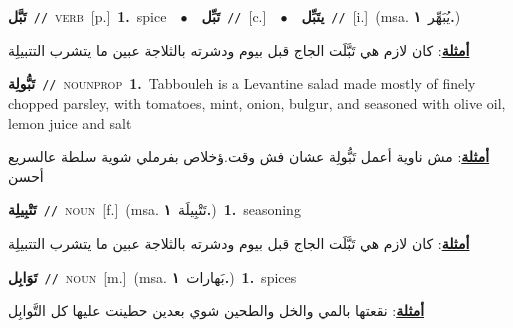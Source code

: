\documentclass[10pt,a4paper,twoside]{article} %
\begin{document}
\begin{multicols}{2}
{\setlength\topsep{0pt}\textbf{\foreignlanguage{arabic}{تَبَّل}}\ {\color{gray}\texttt{//}\color{black}}\ \textsc{verb}\ [p.]\ \textbf{1.}~spice\ \ $\bullet$\ \ \setlength\topsep{0pt}\textbf{\foreignlanguage{arabic}{تَبِّل}}\ {\color{gray}\texttt{//}\color{black}}\ [c.]\ \ $\bullet$\ \ \setlength\topsep{0pt}\textbf{\foreignlanguage{arabic}{يتَبِّل}}\ {\color{gray}\texttt{//}\color{black}}\ [i.]\ \color{gray}(msa. \foreignlanguage{arabic}{يُبَهِّر}~\foreignlanguage{arabic}{\textbf{١.}})\color{black}\  \begin{flushright}\color{gray}\foreignlanguage{arabic}{\textbf{\underline{\foreignlanguage{arabic}{أمثلة}}}: كان لازم هي تَبَّلَت الجاج قبل بيوم ودشرته بالثلاجة عبين ما يتشرب التتبيلِة}\end{flushright}\color{black}} \vspace{2mm}

{\setlength\topsep{0pt}\textbf{\foreignlanguage{arabic}{تَبُّولِة}}\ {\color{gray}\texttt{//}\color{black}}\ \textsc{noun\textunderscore prop}\ \textbf{1.}~Tabbouleh is a Levantine salad made mostly of finely chopped parsley, with tomatoes, mint, onion, bulgur, and seasoned with olive oil, lemon juice and salt\  \begin{flushright}\color{gray}\foreignlanguage{arabic}{\textbf{\underline{\foreignlanguage{arabic}{أمثلة}}}: مش ناوية أعمل تَبُّولِة عشان فش وقت.ؤخلاص بفرملي شوية سلطة عالسريع أحسن}\end{flushright}\color{black}} \vspace{2mm}

{\setlength\topsep{0pt}\textbf{\foreignlanguage{arabic}{تَتْبِيلِة}}\ {\color{gray}\texttt{//}\color{black}}\ \textsc{noun}\ [f.]\ \color{gray}(msa. \foreignlanguage{arabic}{تَتْبِيلَة}~\foreignlanguage{arabic}{\textbf{١.}})\color{black}\ \textbf{1.}~seasoning\  \begin{flushright}\color{gray}\foreignlanguage{arabic}{\textbf{\underline{\foreignlanguage{arabic}{أمثلة}}}: كان لازم هي تَبَّلَت الجاج قبل بيوم ودشرته بالثلاجة عبين ما يتشرب التتبيلِة}\end{flushright}\color{black}} \vspace{2mm}

{\setlength\topsep{0pt}\textbf{\foreignlanguage{arabic}{تَوَابِل}}\ {\color{gray}\texttt{//}\color{black}}\ \textsc{noun}\ [m.]\ \color{gray}(msa. \foreignlanguage{arabic}{بَهارات}~\foreignlanguage{arabic}{\textbf{١.}})\color{black}\ \textbf{1.}~spices\  \begin{flushright}\color{gray}\foreignlanguage{arabic}{\textbf{\underline{\foreignlanguage{arabic}{أمثلة}}}: نقعتها بالمي والخل والطحين شوي بعدين حطينت عليها كل التَّوابِل}\end{flushright}\color{black}} \vspace{2mm}


\end{multicols}
\end{document}
